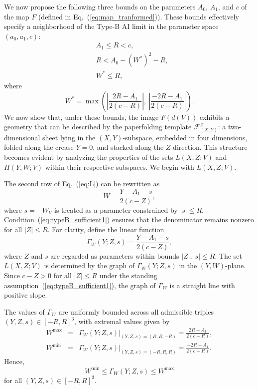 \documentclass[12pt]{iopart}
\begin{document}
We now propose the following three bounds on the parameters \( A_0 \), \( A_1 \), and \( c \) of the map \( F \) (defined in Eq.~(\ref{eq:map_tranformed})). These bounds effectively specify a neighborhood of the Type-B AI limit in the parameter space \( (a_0, a_1, c) \):
\begin{eqnarray}
\label{eq:typeB_sufficient1}
&A_1 \le R < c,\\
\label{eq:typeB_sufficient2}
&R < A_0 - (W^*)^2 - R,\\
\label{eq:typeB_sufficient3}
&W^* \le R,
\end{eqnarray}
where
\[
W^* = \max\left( \left| \frac{2R - A_1}{2(c - R)} \right|,\ \left| \frac{-2R - A_1}{2(c - R)} \right| \right).
\]
We now show that, under these bounds, the image \( F(d(V)) \) exhibits a geometry that can be described by the paperfolding template \( \mathcal{F}^Z_{(X,\underline{Y})} \): a two-dimensional sheet lying in the \( (X,Y) \)-subspace, embedded in four dimensions, folded along the crease \( Y = 0 \), and stacked along the \( Z \)-direction. This structure becomes evident by analyzing the properties of the sets \( L(X,Z;V) \) and \( H(Y,W;V) \) within their respective subspaces. We begin with \( L(X,Z;V) \).

The second row of Eq.~(\ref{eq:L}) can be rewritten as
\begin{equation}\label{eq:W in terms of Y Z s}
W = \frac{Y - A_1 - s}{2(c - Z)},
\end{equation}
where \( s = -W_V \) is treated as a parameter constrained by \( |s| \leq R \). Condition~(\ref{eq:typeB_sufficient1}) ensures that the denominator remains nonzero for all $|Z|\leq R$. For clarity, define the linear function
\begin{equation}
\Gamma_W(Y;Z,s) = \frac{Y - A_1 - s}{2(c - Z)},
\end{equation}
where \( Z \) and \( s \) are regarded as parameters within bounds \( |Z|, |s| \leq R \). The set \( L(X,Z;V) \) is determined by the graph of \( \Gamma_W(Y;Z,s) \) in the \( (Y,W) \)-plane. Since \( c - Z > 0 \) for all $|Z|\leq R$ under the standing assumption~(\ref{eq:typeB_sufficient1}), the graph of \( \Gamma_W \) is a straight line with positive slope.

The values of \( \Gamma_W \) are uniformly bounded across all admissible triples \( (Y,Z,s) \in [-R,R]^3 \), with extremal values given by
\begin{eqnarray}
W^{\max} &=& \Gamma_W(Y;Z,s)\Big|_{(Y,Z,s) = (R,R,-R)} = \frac{2R - A_1}{2(c - R)},\\
W^{\min} &=& \Gamma_W(Y;Z,s)\Big|_{(Y,Z,s) = (-R,R,R)} = \frac{-2R - A_1}{2(c - R)}.
\end{eqnarray}
Hence,
\begin{equation}\label{eq:Y W uniform bounds}
W^{\min} \leq \Gamma_W(Y;Z,s) \leq W^{\max}
\end{equation}
for all \( (Y,Z,s) \in [-R,R]^3 \). 
\end{document}
